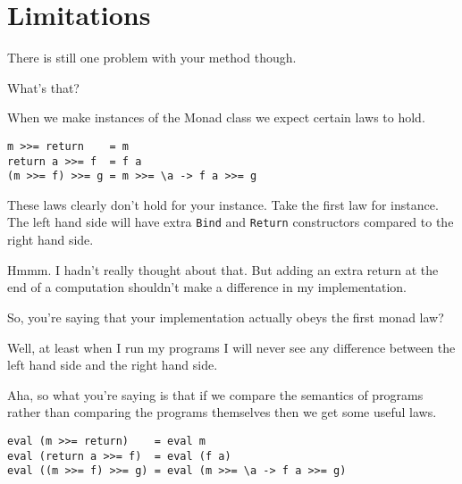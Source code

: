 \section{Limitations} 

\begin{dialogue}
\speak{\docname{}} There is still one problem with your method though.

\speak{\studname{}} What's that?

\speak{\docname{}} When we make instances of the Monad class we expect
certain laws to hold. 

\end{dialogue}

\begin{small}
\begin{verbatim}
m >>= return    = m
return a >>= f  = f a
(m >>= f) >>= g = m >>= \a -> f a >>= g
\end{verbatim}
\end{small}

\begin{dialogue}
\speak{\docname{}} These laws clearly don't hold for your instance. Take the
first law for instance. The left hand side will have extra \texttt{Bind} and
\texttt{Return} constructors compared to the right hand side.

\speak{\studname{}} Hmmm. I hadn't really thought about that. But adding an
extra return at the end of a computation shouldn't make a difference
in my implementation.

\speak{\docname{}} So, you're saying that your implementation actually obeys
the first monad law?

\speak{\studname{}} Well, at least when I run my programs I will never see
any difference between the left hand side and the right hand side.

\speak{\docname{}} Aha, so what you're saying is that if we compare the
semantics of programs rather than comparing the programs themselves
then we get some useful laws. 

\end{dialogue}

\begin{small}
\begin{verbatim}
eval (m >>= return)    = eval m
eval (return a >>= f)  = eval (f a)
eval ((m >>= f) >>= g) = eval (m >>= \a -> f a >>= g)
\end{verbatim}
\end{small}


